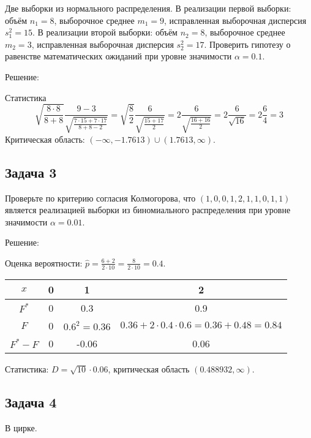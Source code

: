 \documentclass[a4paper,12pt]{article}
\begin{document}
Две выборки из нормального распределения. В реализации первой выборки: объём $n_1 = 8$, выборочное среднее $m_1 = 9$, исправленная выборочная дисперсия
$s_1^2 = 15$. В реализации второй выборки: объём $n_2 = 8$, выборочное среднее $m_2 = 3$, исправленная выборочная дисперсия $s_2^2 = 17$.
Проверить гипотезу о равенстве математических ожиданий при уровне значимости $\alpha = 0.1$.

Решение:

Статистика
\[
    \sqrt{\frac{8 \cdot 8}{8 + 8}} \frac{9 - 3}{\sqrt{\frac{7 \cdot 15 + 7 \cdot 17}{8 + 8 - 2}}}
    = \sqrt{\frac{8}{2}} \frac{6}{\sqrt{\frac{15 + 17}{2}}}
    = 2 \frac{6}{\sqrt{\frac{16 + 16}{2}}}
    = 2 \frac{6}{\sqrt{16}}
    = 2 \frac{6}{4}
    = 3
\]
Критическая область: $(- \infty, -1.7613) \cup (1.7613, \infty)$.

\subsection*{Задача 3}

Проверьте по критерию согласия Колмогорова, что $(1, 0, 0, 1, 2, 1, 1, 0, 1, 1)$ является реализацией выборки из биномиального распределения при
уровне значимости $\alpha = 0.01$.

Решение:

Оценка вероятности: $\widehat{p} = \frac{6+2}{2 \cdot 10} = \frac{8}{2 \cdot 10} = 0.4$.

\begin{tabular}{|c|c|c|c|}
    \hline
    $x$       & 0 & 1              & 2                                                   \\
    \hline
    $F^*$     & 0 & 0.3            & 0.9                                                 \\
    \hline
    $F$       & 0 & $0.6^2 = 0.36$ & $0.36 + 2 \cdot 0.4 \cdot 0.6 = 0.36 + 0.48 = 0.84$ \\
    \hline
    $F^* - F$ & 0 & -0.06          & 0.06                                                \\
    \hline
\end{tabular}

Статистика: $D = \sqrt{10} \cdot 0.06$, критическая область $(0.488932, \infty)$.

\subsection*{Задача 4}

В цирке.
\end{document}
